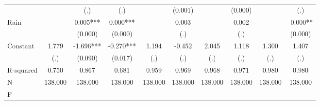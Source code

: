 {\begin{tabular}{l*{9}{c}}
                    &               &         (.)   &         (.)   &               &     (0.001)   &               &     (0.000)   &               &         (.)   \\
Rain                &               &       0.005***&       0.000***&               &       0.003   &               &       0.002   &               &      -0.000** \\
                    &               &     (0.000)   &     (0.000)   &               &         (.)   &               &         (.)   &               &     (0.000)   \\
Constant            &       1.779   &      -1.696***&      -0.270***&       1.194   &      -0.452   &       2.045   &       1.118   &       1.300   &       1.407   \\
                    &         (.)   &     (0.090)   &     (0.017)   &         (.)   &         (.)   &         (.)   &         (.)   &         (.)   &         (.)   \\
\hline
R-squared           &       0.750   &       0.867   &       0.681   &       0.959   &       0.969   &       0.968   &       0.971   &       0.980   &       0.980   \\
N                   &     138.000   &     138.000   &     138.000   &     138.000   &     138.000   &     138.000   &     138.000   &     138.000   &     138.000   \\
F                   &               &               &               &               &               &               &               &               &               \\
\hline\hline
\end{tabular}
}
